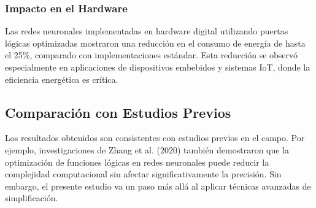 \documentclass{article}
\begin{document}
\begin{multicols}{2}
\subsubsection{Impacto en el Hardware}
Las redes neuronales implementadas en hardware digital utilizando puertas lógicas optimizadas 
mostraron una reducción en el consumo de energía de hasta el 25\%, comparado con implementaciones 
estándar. Esta reducción se observó especialmente en aplicaciones de dispositivos embebidos y sistemas 
IoT, donde la eficiencia energética es crítica.

\subsection{Comparación con Estudios Previos}
Los resultados obtenidos son consistentes con estudios previos en el campo. Por ejemplo, 
investigaciones de Zhang et al. (2020) también demostraron que la optimización de funciones 
lógicas en redes neuronales puede reducir la complejidad computacional sin afectar significativamente 
la precisión. Sin embargo, el presente estudio va un paso más allá al aplicar técnicas avanzadas 
de simplificación.









\end{multicols}
\end{document}
